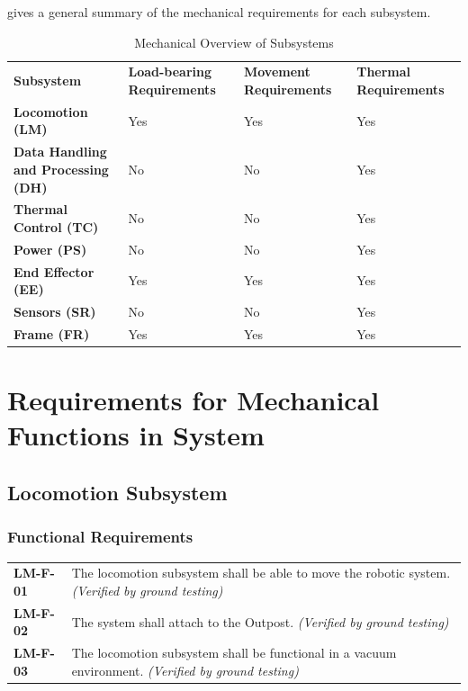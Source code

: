 \documentclass[12pt, letterpaper]{article}
\begin{document}
 gives a general summary of the mechanical requirements for each subsystem.

\begin{table}[H]
\caption{Mechanical Overview of Subsystems}
\begin{tabular}{|P{4.8cm}|P{3.3cm}|P{3.3cm}|P{3.3cm}|}
\hline
\textbf{Subsystem}	&	\textbf{Load-bearing Requirements}	&	\textbf{Movement Requirements}	&	\textbf{Thermal Requirements}	\\\hhline{|=|=|=|=|}
\textbf{Locomotion (LM)}					&	Yes	&	Yes	&	Yes	\\\hline
\textbf{Data Handling and Processing (DH)}	&	No	&	No	&	Yes	\\\hline
\textbf{Thermal Control (TC)}				&	No	&	No	&	Yes	\\\hline
\textbf{Power (PS)}							&	No	&	No	&	Yes	\\\hline
\textbf{End Effector (EE)}					&	Yes	&	Yes	&	Yes	\\\hline
\textbf{Sensors (SR)}						&	No	&	No	&	Yes	\\\hline
\textbf{Frame (FR)}							&	Yes	&	Yes	&	Yes	\\\hline
\end{tabular}
\label{table:mechoverview}
\end{table}


\section{Requirements for Mechanical Functions in System}
\label{sect:requirements}


\subsection{Locomotion Subsystem}
\label{sect:locomotion}
\subsubsection*{Functional Requirements}
\captionsetup[table]{list=no}
\vspace{-20pt}
\begin{longtable}{P{2cm}P{13.75cm}}
\textbf{LM-F-01}	&
The locomotion subsystem shall be able to move the robotic system.
\textit{(Verified by ground testing)}	\\
\textbf{LM-F-02}	&
The system shall attach to the Outpost.
\textit{(Verified by ground testing)}	\\
\textbf{LM-F-03}	&
The locomotion subsystem shall be functional in a vacuum environment.
\textit{(Verified by ground testing)}
\end{longtable}
\end{document}
